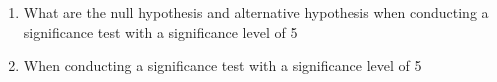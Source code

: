 \begin{enumerate}
	\item What are the null hypothesis and alternative hypothesis when conducting a significance test with a significance level of 5%
	\item When conducting a significance test with a significance level of 5%
\end{enumerate}
